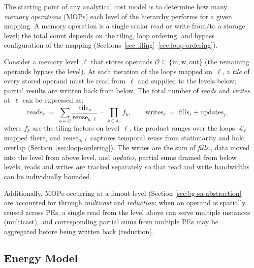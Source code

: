 The starting point of any analytical cost model is to determine how many
\emph{memory operations} (MOPs) each level of the hierarchy performs for a
given mapping.
A memory operation is a single scalar read or write from/to a storage level;
the total count depends on the tiling, loop ordering, and bypass
configuration of the mapping (Sections~\ref{sec:tiling}--\ref{sec:loop-ordering}).

Consider a memory level~$\ell$ that stores operands $\mathcal{O} \subseteq
\{\text{in}, \text{w}, \text{out}\}$ (the remaining operands bypass the
level).
At each iteration of the loops mapped on~$\ell$, a \emph{tile} of every
stored operand must be read from~$\ell$ and supplied to the levels below;
partial results are written back from below.
The total number of \emph{reads} and \emph{writes} at~$\ell$ can be
expressed as:
\begin{equation}
\label{eq:mops}
\text{reads}_\ell \;=\; \sum_{o \in \mathcal{O}}
  \frac{\text{tile}_{o}}{\text{reuse}_{o,\ell}}
  \;\cdot\; \prod_{k \in \mathcal{L}_\ell} f_k,
\qquad
\text{writes}_\ell \;=\; \text{fills}_\ell + \text{updates}_\ell,
\end{equation}
where $f_k$ are the tiling factors on level~$\ell$, the product ranges over
the loops~$\mathcal{L}_\ell$ mapped there, and $\text{reuse}_{o,\ell}$
captures temporal reuse from stationarity and halo overlap
(Section~\ref{sec:loop-ordering}).
The writes are the sum of \emph{fills}., data moved into the level from above level, and \emph{updates}, partial
sums drained from below levels, reads and writes are tracked separately so that read and write
bandwidths can be individually bounded.

Additionally, MOPs occurring at a fanout level (Section \ref{sec:bg-sa-abstraction}
are accounted for through \emph{multicast} and \emph{reduction}:
when an operand is spatially reused across PEs, a single read from the
level above can serve multiple instances (multicast), and corresponding
partial sums from multiple PEs may be aggregated before being written back
(reduction).

\subsection{Energy Model}
\label{sec:energy-model}

